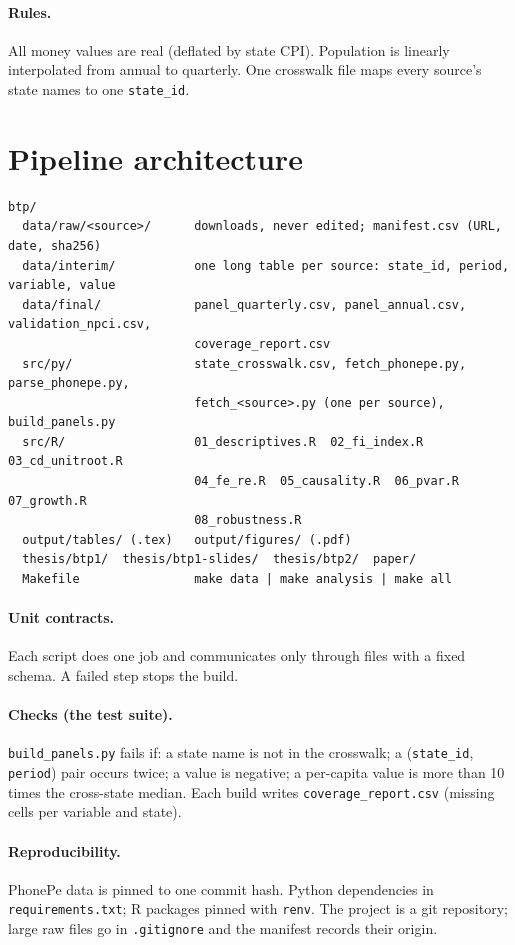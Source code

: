 \documentclass[11pt,a4paper]{article}
\begin{document}
\paragraph{Rules.} All money values are real (deflated by state CPI). Population is linearly
interpolated from annual to quarterly. One crosswalk file maps every source's state names to one
\texttt{state\_id}.

\section{Pipeline architecture}

{\footnotesize
\begin{verbatim}
btp/
  data/raw/<source>/      downloads, never edited; manifest.csv (URL, date, sha256)
  data/interim/           one long table per source: state_id, period, variable, value
  data/final/             panel_quarterly.csv, panel_annual.csv, validation_npci.csv,
                          coverage_report.csv
  src/py/                 state_crosswalk.csv, fetch_phonepe.py, parse_phonepe.py,
                          fetch_<source>.py (one per source), build_panels.py
  src/R/                  01_descriptives.R  02_fi_index.R  03_cd_unitroot.R
                          04_fe_re.R  05_causality.R  06_pvar.R  07_growth.R
                          08_robustness.R
  output/tables/ (.tex)   output/figures/ (.pdf)
  thesis/btp1/  thesis/btp1-slides/  thesis/btp2/  paper/
  Makefile                make data | make analysis | make all
\end{verbatim}
}

\paragraph{Unit contracts.} Each script does one job and communicates only through files with a fixed
schema. A failed step stops the build.

\paragraph{Checks (the test suite).} \texttt{build\_panels.py} fails if: a state name is not in the
crosswalk; a (\texttt{state\_id}, \texttt{period}) pair occurs twice; a value is negative; a per-capita
value is more than 10 times the cross-state median. Each build writes \texttt{coverage\_report.csv}
(missing cells per variable and state).

\paragraph{Reproducibility.} PhonePe data is pinned to one commit hash. Python dependencies in
\texttt{requirements.txt}; R packages pinned with \texttt{renv}. The project is a git repository; large
raw files go in \texttt{.gitignore} and the manifest records their origin.
\end{document}
